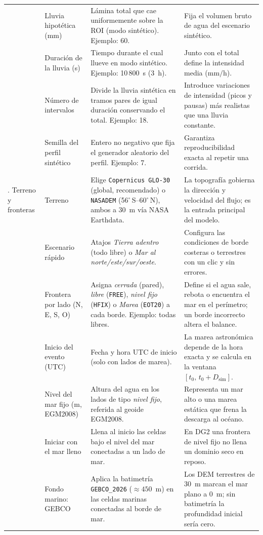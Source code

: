 \documentclass[11pt,letterpaper]{article}
\begin{document}
{\begin{longtable}{@{}>{\raggedright\arraybackslash}p{2.2cm}>{\raggedright\arraybackslash}p{3.1cm}>{\raggedright\arraybackslash}p{5.4cm}>{\raggedright\arraybackslash}p{5.2cm}@{}}
 & Lluvia hipotética (mm) & Lámina total que cae uniformemente sobre la ROI (modo sintético). Ejemplo: 60. & Fija el volumen bruto de agua del escenario sintético.\\
 & Duración de la lluvia (s) & Tiempo durante el cual llueve en modo sintético. Ejemplo: 10\,800~s (3~h). & Junto con el total define la intensidad media ($\text{mm/h}$).\\
 & Número de intervalos & Divide la lluvia sintética en tramos pares de igual duración conservando el total. Ejemplo: 18. & Introduce variaciones de intensidad (picos y pausas) más realistas que una lluvia constante.\\
 & Semilla del perfil sintético & Entero no negativo que fija el generador aleatorio del perfil. Ejemplo: 7. & Garantiza reproducibilidad exacta al repetir una corrida.\\
3. Terreno y fronteras & Terreno & Elige \texttt{Copernicus GLO-30} (global, recomendado) o \texttt{NASADEM} (56$^\circ$\,S--60$^\circ$\,N), ambos a 30~m vía NASA Earthdata. & La topografía gobierna la dirección y velocidad del flujo; es la entrada principal del modelo.\\
 & Escenario rápido & Atajos \emph{Tierra adentro} (todo libre) o \emph{Mar al norte/este/sur/oeste}. & Configura las condiciones de borde costeras o terrestres con un clic y sin errores.\\
 & Frontera por lado (N, E, S, O) & Asigna \emph{cerrada} (pared), \emph{libre} (\texttt{FREE}), \emph{nivel fijo} (\texttt{HFIX}) o \emph{Marea} (\texttt{EOT20}) a cada borde. Ejemplo: todas libres. & Define si el agua sale, rebota o encuentra el mar en el perímetro; un borde incorrecto altera el balance.\\
 & Inicio del evento (UTC) & Fecha y hora UTC de inicio (solo con lados de marea). & La marea astronómica depende de la hora exacta y se calcula en la ventana $[t_0,\, t_0 + D_{\text{sim}}]$.\\
 & Nivel del mar fijo (m, EGM2008) & Altura del agua en los lados de tipo \emph{nivel fijo}, referida al geoide EGM2008. & Representa un mar alto o una marea estática que frena la descarga al océano.\\
 & Iniciar con el mar lleno & Llena al inicio las celdas bajo el nivel del mar conectadas a un lado de mar. & En DG2 una frontera de nivel fijo no llena un dominio seco en reposo.\\
 & Fondo marino: GEBCO & Aplica la batimetría \texttt{GEBCO\_2026} ($\approx 450$~m) en las celdas marinas conectadas al borde de mar. & Los DEM terrestres de 30~m marcan el mar plano a 0~m; sin batimetría la profundidad inicial sería cero.\\

\end{longtable}}
\end{document}
